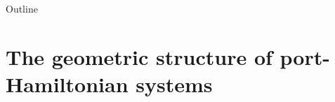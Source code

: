 \documentclass[aspectratio=169]{beamer}
\begin{document}
	
	
	\begin{frame}[plain]
		
		
		
	\end{frame}
	
	
	\begin{frame}{Outline}
		
		\tableofcontents
		
	\end{frame}
	
	
	\section{The geometric structure of port-Hamiltonian systems}
	

	
	
	
\end{document}
